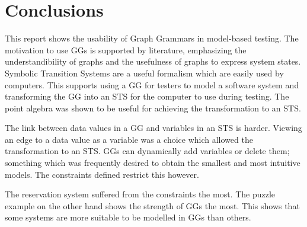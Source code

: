 \section{Conclusions}

This report shows the usability of Graph Grammars in model-based testing. The motivation to use GGs is supported by literature, emphasizing the understandibility of graphs and the usefulness of graphs to express system states. Symbolic Transition Systems are a useful formalism which are easily used by computers. This supports using a GG for testers to model a software system and transforming the GG into an STS for the computer to use during testing. The point algebra was shown to be useful for achieving the transformation to an STS.

The link between data values in a GG and variables in an STS is harder. Viewing an edge to a data value as a variable was a choice which allowed the transformation to an STS. GGs can dynamically add variables or delete them; something which was frequently desired to obtain the smallest and most intuitive models. The constraints defined restrict this however. 

The reservation system suffered from the constraints the most. The puzzle example on the other hand shows the strength of GGs the most. This shows that some systems are more suitable to be modelled in GGs than others. 
